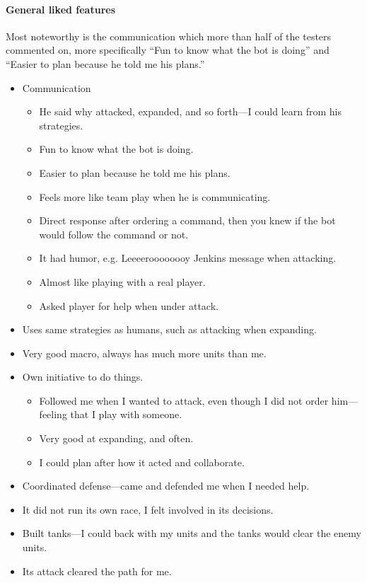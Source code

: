 \paragraph{General liked features}
Most noteworthy is the communication which more than half of the testers commented on, more
specifically ``Fun to know what the bot is doing'' and ``Easier to plan because he told me his
plans.''
\begin{itemize}
	\item Communication
	\begin{itemize}
		\item He said why attacked, expanded, and so forth—I could learn from his strategies.
		\item Fun to know what the bot is doing.
		\item Easier to plan because he told me his plans.
		\item Feels more like team play when he is communicating.
		\item Direct response after ordering a command, then you knew if the bot would follow the command or not.
		\item It had humor, e.g. Leeeeroooooooy Jenkins message when attacking.
		\item Almost like playing with a real player.
		\item Asked player for help when under attack.
	\end{itemize}
	\item Uses same strategies as humans, such as attacking when expanding.
	\item Very good macro, always has much more units than me.
	\item Own initiative to do things.
	\begin{itemize}
		\item Followed me when I wanted to attack, even though I did not order him—feeling that I play with someone.
		\item Very good at expanding, and often.
		\item I could plan after how it acted and collaborate.
	\end{itemize}
	\item Coordinated defense—came and defended me when I needed help.
	\item It did not run its own race, I felt involved in its decisions.
	\item Built tanks—I could back with my units and the tanks would clear the enemy units.
	\item Its attack cleared the path for me.
\end{itemize}

